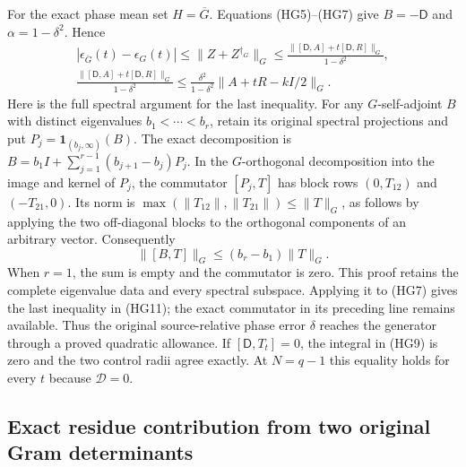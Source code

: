 \documentclass{article}
\begin{document}
For the exact phase mean set $H=\overline G$. Equations (HG5)--(HG7)
give $B=-\mathsf D$ and $\alpha=1-\delta^2$. Hence
\[
\begin{gathered}
 |\epsilon_{\overline G}(t)-\epsilon_G(t)|
 \le\|Z+Z^{\dagger_G}\|_G
 \le\frac{\|[\mathsf D,A]+t[\mathsf D,R]\|_G}{1-\delta^2},\\
 \frac{\|[\mathsf D,A]+t[\mathsf D,R]\|_G}{1-\delta^2}
 \le\frac{\delta^2}{1-\delta^2}\|A+tR-kI/2\|_G .
\end{gathered}\tag{HG11}
\]
Here is the full spectral argument for the last inequality. For any
$G$-self-adjoint $B$ with distinct eigenvalues
$b_1<\cdots<b_r$, retain its original spectral projections and put
$P_j=\mathbf1_{(b_j,\infty)}(B)$. The exact decomposition is
$B=b_1I+\sum_{j=1}^{r-1}(b_{j+1}-b_j)P_j$.
In the $G$-orthogonal decomposition into the image and kernel of
$P_j$, the commutator $[P_j,T]$ has block rows $(0,T_{12})$
and $(-T_{21},0)$. Its norm is
$\max(\|T_{12}\|,\|T_{21}\|)\le\|T\|_G$, as follows by
applying the two off-diagonal blocks to the orthogonal components of
an arbitrary vector. Consequently
\[
 \|[B,T]\|_G\le (b_r-b_1)\|T\|_G .\tag{HG11a}
\]
When $r=1$, the sum is empty and the commutator is zero.
This proof retains the complete eigenvalue data and every spectral
subspace. Applying it to (HG7) gives the last inequality in (HG11);
the exact commutator in its preceding line remains available.
Thus the original
source-relative phase error $\delta$ reaches the generator through
a proved quadratic allowance. If $[\mathsf D,T_t]=0$, the integral
in (HG9) is zero and the two control radii agree exactly. At $N=q-1$
this equality holds for every $t$ because $\mathscr D=0$.

\subsection{Exact residue contribution from two original Gram determinants}
\end{document}

